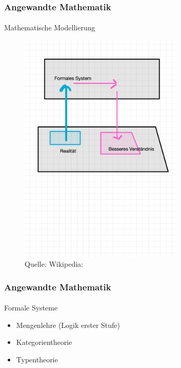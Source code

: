 \documentclass{beamer}
\begin{document}
\begin{frame}
    \frametitle{Angewandte Mathematik}
\framesubtitle{}
    \begin{block}{Mathematische Modellierung}
\begin{figure}[H]
      \centering
    \includegraphics[width=0.7\textwidth]{images/modellierung}
      \caption{Quelle: Wikipedia: }
\end{figure}
\end{block}
 \end{frame}


 \begin{frame}
    \frametitle{Angewandte Mathematik}
\framesubtitle{}
    \begin{block}{Formale Systeme}
\begin{itemize}
\item Mengenlehre (Logik erster Stufe)
\item Kategorientheorie
\item Typentheorie
\end{itemize}
\end{block}
 \end{frame}
\end{document}
